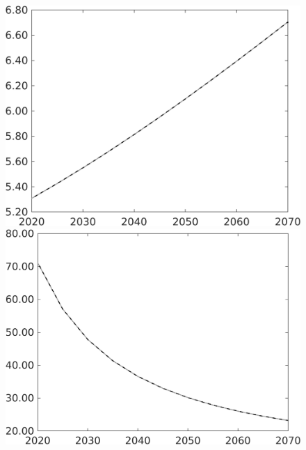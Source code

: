 \begin{figure}[h!!]
\begin{minipage}[]{0.32\textwidth}
\end{minipage}	
\begin{minipage}[]{0.32\textwidth}
\includegraphics[width=1\textwidth]{../../codding_model/own_basedOnFried/optimalPol_010922_revision/figures/all_13Sept22/CompTaul_Equlab_LFBAU_Reg0_gAn_spillover0_nsk1_xgr1_knspil0_sep1_countec0_GovRev1_etaa0.79_lgd0.png}
\end{minipage}	
\begin{minipage}[]{0.32\textwidth}
\includegraphics[width=1\textwidth]{../../codding_model/own_basedOnFried/optimalPol_010922_revision/figures/all_13Sept22/CompTaul_Equlab_LFBAU_Reg0_gAg_spillover0_nsk1_xgr1_knspil0_sep1_countec0_GovRev1_etaa0.79_lgd0.png}

\end{minipage}
\end{figure}
